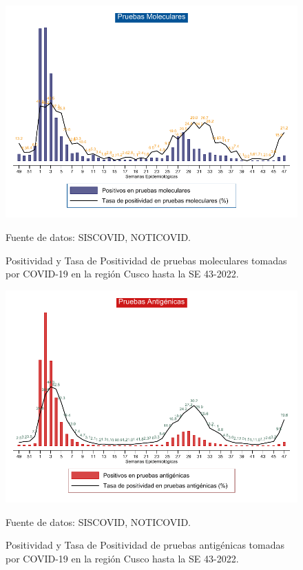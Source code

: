 \documentclass[12pt,a4paper,openany]{book}
\begin{document}
	
	\begin{landscape}
		\begin{figure}[h]
			\caption{Positividad y Tasa de Positividad de pruebas moleculares tomadas por COVID-19 en la región Cusco hasta la SE 43-2022.}\label{fig:positividad_pcr}
			\begin{center}
				\includegraphics[width=0.90\linewidth]{../figuras/positividad_pcr.pdf}
			\end{center}
			{\footnotesize {Fuente de datos: SISCOVID, NOTICOVID.}}
		\end{figure}
	\end{landscape}
	\clearpage
	\begin{landscape}
		
		\begin{figure}[h]
			\caption{ Positividad y Tasa de Positividad de pruebas antigénicas tomadas por COVID-19 en la región Cusco hasta la SE 43-2022.}\label{fig:positividad_ag}
			\begin{center}
				\includegraphics[width=0.90\linewidth]{../figuras/positividad_ag.pdf}
			\end{center}
			{\footnotesize {Fuente de datos: SISCOVID, NOTICOVID.}}
		\end{figure}
	\end{landscape}
\end{document}
